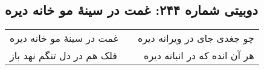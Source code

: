 \begin{center}
\section*{دوبیتی شماره ۲۴۴: غمت در سینهٔ مو خانه دیره}
\label{sec:244}
\begin{longtable}{l p{0.5cm} r}
غمت در سینهٔ مو خانه دیره
&&
چو جغدی جای در ویرانه دیره
\\
فلک هم در دل تنگم نهد باز
&&
هر آن انده که در انبانه دیره
\\
\end{longtable}
\end{center}
